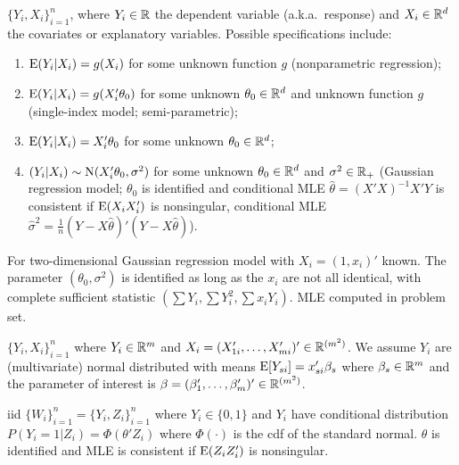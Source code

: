 \documentclass[8pt,letterpaper, landscape]{extarticle} %
\begin{document}
\begin{multicols}{3}
\begin{description}
 $ \{ Y_i , X_i \}_{i=1}^{n} $, where $ Y_i \in \mathbb{R} $ the dependent variable (a.k.a.\ response) and $ X_i \in \mathbb{R}^d $ the covariates or explanatory variables. Possible specifications include:
\begin{enumerate}
\item $ \operatorname{E} (Y_i | X_i) = g(X_i) $ for some unknown function $ g $ (nonparametric regression);
\item $ \operatorname{E} (Y_i | X_i) = g(X_{i}' \theta_0) $ for some unknown $ \theta_0 \in \mathbb{R}^d $ and unknown function $ g $ (single-index model; semi-parametric);
\item $ \operatorname{E} (Y_i | X_i) = X_{i}' \theta_0 $ for some unknown $ \theta_0 \in \mathbb{R}^d $;
\item $ (Y_i | X_i) \sim \operatorname{N} (X_{i}' \theta_0 , \sigma^2) $ for some unknown $ \theta_0 \in \mathbb{R}^d $ and $ \sigma^2 \in \mathbb{R}_+ $ (Gaussian regression model; $ \theta_0 $ is identified and conditional MLE $ \hat{\theta} = (X' X)^{-1}X' Y $ is consistent if $ \operatorname{E} (X_i X_{i}') $ is nonsingular, conditional MLE $ \hat{\sigma}^2 = \tfrac{1}{n} (Y - X \hat{\theta})' (Y - X \hat{\theta}) $).
\end{enumerate}

 For two-dimensional Gaussian regression model with $ X_i = (1, x_i)' $ known. The parameter $ (\theta_0, \sigma^2) $ is identified as long as the $ x_i $ are not all identical, with complete sufficient statistic $ (\sum Y_i, \sum Y_i^2, \sum x_i Y_i) $. MLE computed in problem set.

 $ \{ Y_i , X_i \}_{i=1}^{n} $ where $ Y_i \in \mathbb{R}^m $ and $ X_i = (X_{1i}', \dotsc , X_{mi}')' \in \mathbb{R}^{(m^{2})} $. We assume $ Y_i $ are (multivariate) normal distributed with means $ \operatorname{E} [Y_{si}] = x_{si}' \beta_{s} $ where $ \beta_{s} \in \mathbb{R}^m $ and the parameter of interest is $ \beta = (\beta_{1}', \dotsc , \beta_{m}')' \in \mathbb{R}^{(m^{2})} $.

 iid $ \{ W_i \}_{i=1}^{n} = \{ Y_i , Z_i \}_{i=1}^{n} $ where $ Y_i \in \{0,1\} $ and $ Y_i $ have conditional distribution $ P (Y_i = 1 | Z_i) = \Phi (\theta' Z_i) $ where $ \Phi (\cdot) $ is the cdf of the standard normal. $ \theta $ is identified and MLE is consistent if $ \operatorname{E} (Z_i Z_i') $ is nonsingular.


\end{description}
\end{multicols}
\end{document}
